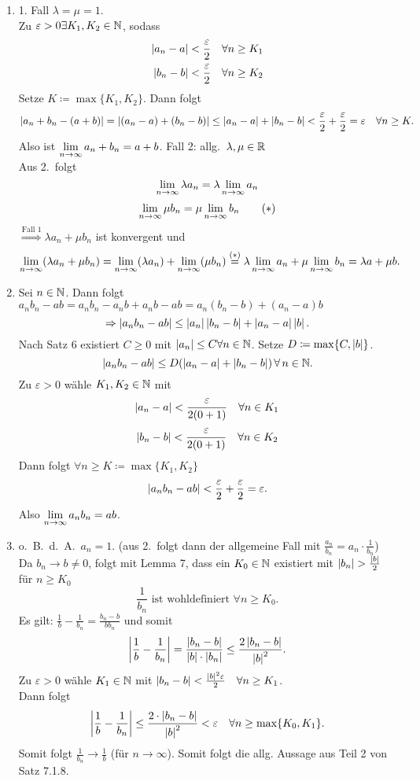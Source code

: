 \documentclass[../ana1.tex]{subfiles}
\begin{document}
\begin{bew}
	\begin{enumerate}
		\item 1. Fall \(\lambda = \mu = 1 \).\\
		Zu \(\varepsilon>0 \exists K_1, K_2 \in\mathbb{N} \), sodass
		\begin{align*}
			\left|a_n-a\right|<\frac{\varepsilon}{2} \quad \forall n\geq K_1\\
			\left|b_n-b\right|<\frac{\varepsilon}{2} \quad \forall n\geq K_2
		\end{align*}
		Setze \(K \coloneqq \max \{K_1, K_2\} \). Dann folgt
		\[\left|a_n + b_n - (a+b)\right| = \left|(a_n-a)+(b_n-b)\right| \leq \left|a_n-a\right|+\left|b_n-b\right| < \frac{\varepsilon}{2} + \frac{\varepsilon}{2} = \varepsilon \quad \forall n\geq K. \]
		Also ist \(\lim\limits_{n\rightarrow\infty}a_n+b_n=a+b \).
		Fall 2: allg.\  \(\lambda,\mu\in\mathbb{R} \) \\
		Aus 2.\ folgt
		\[\lim\limits_{n\rightarrow\infty} \lambda a_n = \lambda \lim\limits_{n\rightarrow\infty} a_n \]
		\[\lim\limits_{n\rightarrow\infty} \mu b_n = \mu \lim\limits_{n\rightarrow\infty} b_n \qquad(*) \]
		\(\overset{\text{Fall 1}}{\Rightarrow} \lambda a_n + \mu b_n \) ist konvergent und
		\[\lim\limits_{n\rightarrow\infty} (\lambda a_n + \mu b_n) = \lim\limits_{n\rightarrow\infty} (\lambda a_n) + \lim\limits_{n\rightarrow\infty} (\mu b_n) \overset{(*)}{=} \lambda \lim\limits_{n\rightarrow\infty} a_n + \mu \lim\limits_{n\rightarrow\infty} b_n = \lambda a + \mu b. \]
		\item Sei \(n\in\mathbb{N} \). Dann folgt \(a_n b_n-ab = a_n b_n -a_n b + a_n b - ab=a_n(b_n-b)+(a_n-a)b \)
		\[\Rightarrow \left|a_n b_n -ab\right|\leq \left|a_n\right| \left|b_n-b\right| + \left|a_n-a\right|\left|b\right|. \]
		Nach Satz 6 existiert \(C\geq 0 \) mit \(\left|a_n\right|\leq C \forall n\in\mathbb{N} \). Setze \(D\coloneqq \max \{C, \left|b\right|\} \).
		\[\left|a_n b_n - ab\right| \leq D(\left|a_n-a\right|+\left|b_n-b\right|) \,\forall \, n\in\mathbb{N}. \]
		Zu \(\varepsilon > 0 \) wähle \(K_1,K_2\in\mathbb{N} \) mit
		\[\left|a_n-a\right|<\frac{\varepsilon}{2(0+1)} \quad \forall n\in K_1 \]
		\[\left|b_n-b\right|<\frac{\varepsilon}{2(0+1)} \quad \forall n\in K_2 \]
		Dann folgt \(\forall n\geq K \coloneqq \max \{K_1, K_2\} \)
		\[\left|a_n b_n - ab\right|<\frac{\varepsilon}{2} + \frac{\varepsilon}{2} = \varepsilon. \]
		Also \(\lim\limits_{n\rightarrow\infty} a_n b_n = ab \).
		\item o.\ B.\ d.\ A.\  \(a_n = 1 \). (aus 2.\ folgt dann der allgemeine Fall mit \( \frac{a_n}{b_n} = a_n \cdot\frac{1}{b_n} \))\\
		Da \(b_n \rightarrow b \neq 0 \), folgt mit Lemma 7, dass ein \(K_0\in\mathbb{N} \) existiert mit \(\left|b_n\right| >\frac{\left|b\right|}{2} \) für \(n\geq K_0 \)
		\[\frac{1}{b_n} \text{ ist wohldefiniert } \forall n\geq K_0. \]
		Es gilt: \( \frac{1}{b} - \frac{1}{b_n} = \frac{b_n - b}{b b_n} \) und somit
		\[ \left| \frac{1}{b} - \frac{1}{b_n}\right| = \frac{\left|b_n-b\right|}{\left|b\right| \cdot \left|b_n\right|} \leq \frac{2 \left|b_n - b\right|}{\left|b\right|^2}. \]
		Zu \(\varepsilon >0 \) wähle \(K_1 \in \mathbb{N} \) mit \(\left|b_n - b\right| < \frac{\left|b\right|^2\varepsilon}{2} \quad \forall n\geq K_1 \).\\
		Dann folgt
		\[ \left| \frac{1}{b} - \frac{1}{b_n}\right| \leq \frac{2 \cdot \left|b_n - b\right|}{\left|b\right|^2} < \varepsilon \quad \forall n\geq\max \{ K_0,K_1\}. \]
		Somit folgt \( \frac{1}{b_n} \rightarrow \frac{1}{b} \) (für \(n\rightarrow \infty \)). Somit folgt die allg. Aussage aus Teil 2 von Satz 7.1.8.
	\end{enumerate}
\end{bew}
\end{document}
